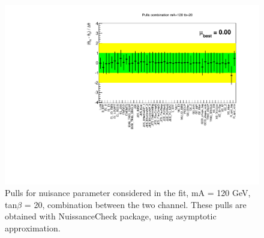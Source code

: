 \begin{figure}[htp]
     \begin{center}

            \includegraphics[width=\textwidth]{figure/np_check/120_comb_pulls.pdf}
    \end{center}
    \caption{ Pulls for nuisance parameter considered in the fit,  mA = 120 GeV, tan$\beta$ = 20, combination between the two channel. These pulls are obtained with
	NuissanceCheck package, using asymptotic approximation.} 
    \label{fig:np_pull_comb}
\end{figure}

